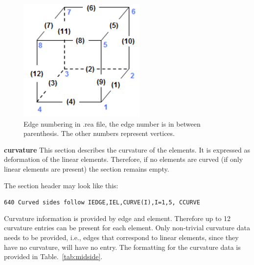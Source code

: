 \begin{description}
\begin{figure}
\begin{center}
\includegraphics[scale=0.5]{Figs/3dcube}
\caption{Edge numbering in .rea file, the edge number is in between parenthesis. The other numbers represent vertices.}
\label{fig:edges}
\end{center}
\end{figure}


%


\item{\bf curvature} 
     This section describes the curvature of the elements. It is expressed as deformation of the linear elements.  
     Therefore, if no elements are curved (if only linear elements are present) the section remains empty.

     The section header may look like this:

     \begin{center}
     \texttt{640 Curved sides follow IEDGE,IEL,CURVE(I),I=1,5, CCURVE}
     \end{center}

     Curvature information is provided by edge and element. Therefore up to 12 curvature entries can be present for each element.
Only non-trivial curvature data needs to be provided, i.e., edges that correspond to linear elements, since they have no curvature, will have no entry.
The formatting for the curvature data is provided in Table.~\ref{tab:midside}. 


\end{description}
